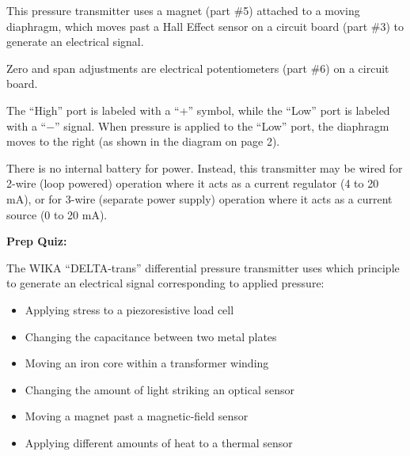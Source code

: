 












This pressure transmitter uses a magnet (part \#5) attached to a moving diaphragm, which moves past a Hall Effect sensor on a circuit board (part \#3) to generate an electrical signal.

\vskip 10pt

Zero and span adjustments are electrical potentiometers (part \#6) on a circuit board.

\vskip 10pt

The ``High'' port is labeled with a ``+'' symbol, while the ``Low'' port is labeled with a ``$-$'' signal.  When pressure is applied to the ``Low'' port, the diaphragm moves to the right (as shown in the diagram on page 2).

\vskip 10pt

There is no internal battery for power.  Instead, this transmitter may be wired for 2-wire (loop powered) operation where it acts as a current regulator (4 to 20 mA), or for 3-wire (separate power supply) operation where it acts as a current source (0 to 20 mA).







\vfil \eject

\noindent
{\bf Prep Quiz:}

\vskip 10pt

The WIKA ``DELTA-trans'' differential pressure transmitter uses which principle to generate an electrical signal corresponding to applied pressure:

\begin{itemize}
\item{} Applying stress to a piezoresistive load cell
\vskip 5pt 
\item{} Changing the capacitance between two metal plates
\vskip 5pt 
\item{} Moving an iron core within a transformer winding
\vskip 5pt 
\item{} Changing the amount of light striking an optical sensor
\vskip 5pt 
\item{} Moving a magnet past a magnetic-field sensor
\vskip 5pt 
\item{} Applying different amounts of heat to a thermal sensor
\end{itemize}




